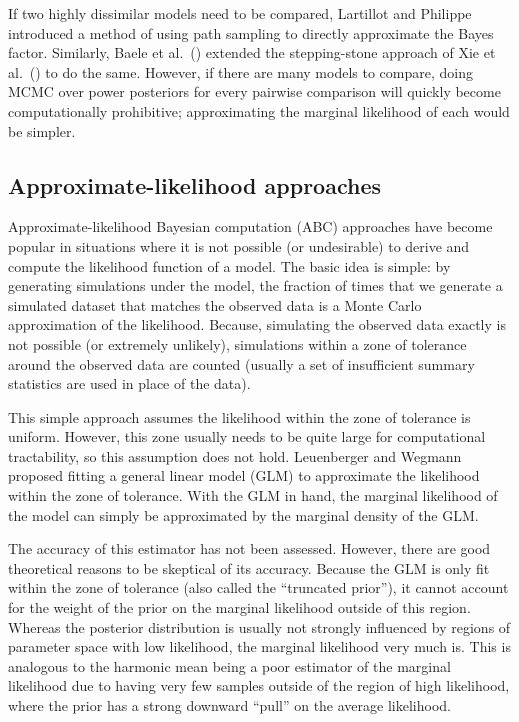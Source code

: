 If two highly dissimilar models need to be compared,
Lartillot and Philippe \citeyear{Lartillot2006} introduced a method of using
path sampling to directly approximate the Bayes factor.
Similarly, Baele et al.\ (\citeyear{Baele2013}) extended the stepping-stone
approach of Xie et al.\  (\citeyear{Xie2011}) to do the same.
However, if there are many models to compare, doing MCMC over power posteriors
for every pairwise comparison will quickly become computationally prohibitive;
approximating the marginal likelihood of each would be simpler.

\subsection{Approximate-likelihood approaches}

Approximate-likelihood Bayesian computation (ABC) approaches
\citep{Tavare1997,Beaumont2002} have become popular in situations where it is
not possible (or undesirable) to derive and compute the likelihood function of
a model.
The basic idea is simple: by generating simulations under the model, the
fraction of times that we generate a simulated dataset that matches the
observed data is a Monte Carlo approximation of the likelihood.
Because, simulating the observed data exactly is not possible (or extremely
unlikely), simulations within a zone of tolerance around the observed data are
counted (usually a set of insufficient summary statistics are used in place of
the data).

This simple approach assumes the likelihood within the zone of tolerance is
uniform.
However, this zone usually needs to be quite large for computational
tractability, so this assumption does not hold.
Leuenberger and Wegmann \citep{Leuenberger2010} proposed fitting a general
linear model (GLM) to approximate the likelihood within the zone of tolerance.
With the GLM in hand, the marginal likelihood of the model can simply be
approximated by the marginal density of the GLM.

The accuracy of this estimator has not been assessed.
However, there are good theoretical reasons to be skeptical of its accuracy.
Because the GLM is only fit within the zone of tolerance (also called the
``truncated prior''), it cannot account for the weight of the prior on the
marginal likelihood outside of this region.
Whereas the posterior distribution is usually not strongly influenced by
regions of parameter space with low likelihood, the marginal likelihood very
much is.
This is analogous to the harmonic mean being a poor estimator of the marginal
likelihood due to having very few samples outside of the region of high
likelihood, where the prior has a strong downward ``pull'' on the average
likelihood.

